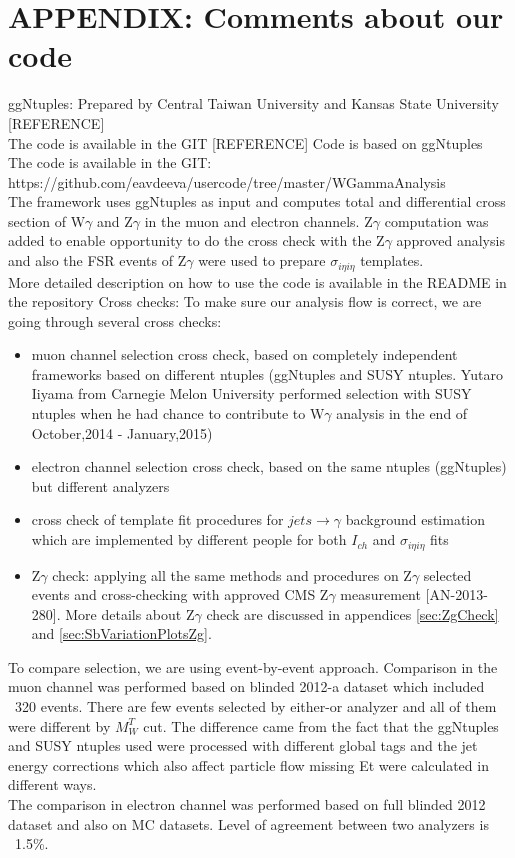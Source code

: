 \section{APPENDIX: Comments about our code}
\label{sec:Code}
ggNtuples:
Prepared by Central Taiwan University and Kansas State University [REFERENCE]\\
The code is available in the GIT [REFERENCE]
Code is based on ggNtuples\\
The code is available in the GIT: https://github.com/eavdeeva/usercode/tree/master/WGammaAnalysis\\
The framework uses ggNtuples as input and computes total and differential cross section of W$\gamma$ and Z$\gamma$ in the muon and electron channels. Z$\gamma$ computation was added to enable opportunity to do the cross check with the Z$\gamma$ approved analysis and also the FSR events of Z$\gamma$ were used to prepare $\sigma_{i \eta i \eta}$ templates. \\
More detailed description on how to use the code is available in the README in the repository 
Cross checks:
To make sure our analysis flow is correct, we are going through several cross checks:
\begin{itemize}
\item muon channel selection cross check, based on completely independent frameworks based on different ntuples (ggNtuples and
SUSY ntuples. Yutaro Iiyama from Carnegie Melon University performed selection with SUSY ntuples when he had chance to contribute to W$\gamma$ analysis in the end of October,2014 - January,2015)
\item electron channel selection cross check, based on the same ntuples (ggNtuples) but different analyzers
\item cross check of template fit procedures for $jets \rightarrow \gamma$ background estimation which are implemented by different people for both $I_{ch}$ and $\sigma_{i \eta i \eta}$ fits
\item Z$\gamma$ check: applying all the same methods and procedures on
Z$\gamma$ selected events and cross-checking with approved CMS Z$\gamma$ measurement [AN-2013-280]. More details about Z$\gamma$ check are discussed in appendices \ref{sec:ZgCheck} and \ref{sec:SbVariationPlotsZg}. 
\end{itemize}
To compare selection, we are using event-by-event approach. Comparison in the muon channel was performed based on blinded 2012-a dataset which included ~320 events. There are few events selected by either-or analyzer and all of them were different by $M_W^T$ cut. The difference came from the fact that the ggNtuples and SUSY ntuples used were processed with different global tags and the jet energy corrections which also affect particle flow missing Et were calculated in different ways.\\
The comparison in electron channel was performed based on full blinded 2012 dataset and also on MC datasets. Level of agreement between two analyzers is ~1.5\%.\\



